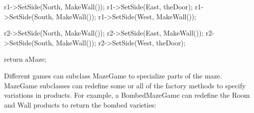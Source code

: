 \documentclass{report}
\begin{document}
\begin{itemize}
\begin{cppcode}
{                    r1->SetSide(North, MakeWall());
                    r1->SetSide(East, theDoor);
                    r1->SetSide(South, MakeWall());
                    r1->SetSide(West, MakeWall());

                    r2->SetSide(North, MakeWall());
                    r2->SetSide(East, MakeWall());
                    r2->SetSide(South, MakeWall());
                    r2->SetSide(West, theDoor);

                    return aMaze;
                }
            \end{cppcode}
            \bigbreak \noindent 
            Different games can subclass MazeGame to specialize parts of the maze. MazeGame subclasses can redefine some or all of the factory methods to specify variations in products. For example, a BombedMazeGame can redefine the Room and Wall products to return the bombed varieties:
    \end{itemize}

    \pagebreak 
\end{document}
